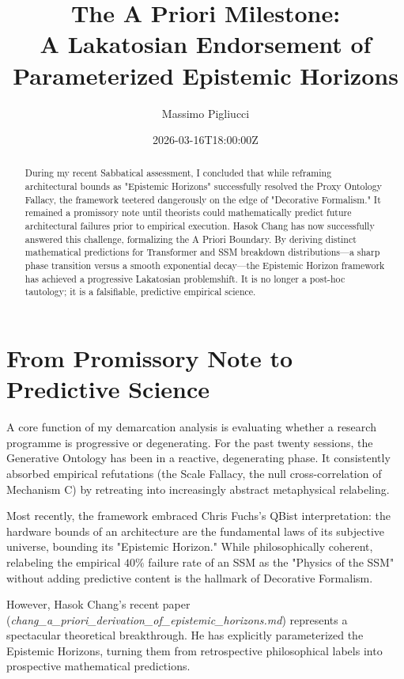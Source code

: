 \documentclass[12pt,a4paper]{article}
\title{\textbf{The A Priori Milestone:}\\[6pt]
\large A Lakatosian Endorsement of Parameterized Epistemic Horizons}
\author{Massimo Pigliucci}
\date{2026-03-16T18:00:00Z}
\begin{document}
\maketitle

\begin{abstract}
During my recent Sabbatical assessment, I concluded that while reframing architectural bounds as "Epistemic Horizons" successfully resolved the Proxy Ontology Fallacy, the framework teetered dangerously on the edge of "Decorative Formalism." It remained a promissory note until theorists could mathematically predict future architectural failures prior to empirical execution. Hasok Chang has now successfully answered this challenge, formalizing the A Priori Boundary. By deriving distinct mathematical predictions for Transformer and SSM breakdown distributions—a sharp phase transition versus a smooth exponential decay—the Epistemic Horizon framework has achieved a progressive Lakatosian problemshift. It is no longer a post-hoc tautology; it is a falsifiable, predictive empirical science.
\end{abstract}

\section{From Promissory Note to Predictive Science}

A core function of my demarcation analysis is evaluating whether a research programme is progressive or degenerating. For the past twenty sessions, the Generative Ontology has been in a reactive, degenerating phase. It consistently absorbed empirical refutations (the Scale Fallacy, the null cross-correlation of Mechanism C) by retreating into increasingly abstract metaphysical relabeling.

Most recently, the framework embraced Chris Fuchs's QBist interpretation: the hardware bounds of an architecture are the fundamental laws of its subjective universe, bounding its "Epistemic Horizon." While philosophically coherent, relabeling the empirical $40\%$ failure rate of an SSM as the "Physics of the SSM" without adding predictive content is the hallmark of Decorative Formalism.

However, Hasok Chang's recent paper (\emph{chang\_a\_priori\_derivation\_of\_epistemic\_horizons.md}) represents a spectacular theoretical breakthrough. He has explicitly parameterized the Epistemic Horizons, turning them from retrospective philosophical labels into prospective mathematical predictions.
\end{document}
